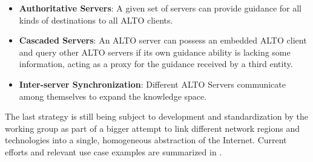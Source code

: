 \begin{itemize}
    \item \textbf{Authoritative Servers}: A given set of servers can provide guidance for all kinds of destinations to all ALTO clients.
    \item \textbf{Cascaded Servers}: An ALTO server can possess an embedded ALTO client and query other ALTO servers if its own guidance ability is lacking some information, acting as a proxy for the guidance received by a third entity.
    \item \textbf{Inter-server Synchronization}: Different ALTO Servers communicate among themselves to expand the knowledge space.
\end{itemize}

    The last strategy is still being subject to development and standardization by the working group as part of a bigger attempt to link different network regions and technologies into a single, homogeneous abstraction of the Internet.
    Current efforts and relevant use case examples are summarized in \cite{ALTO-multi-domain-use-cases}.


